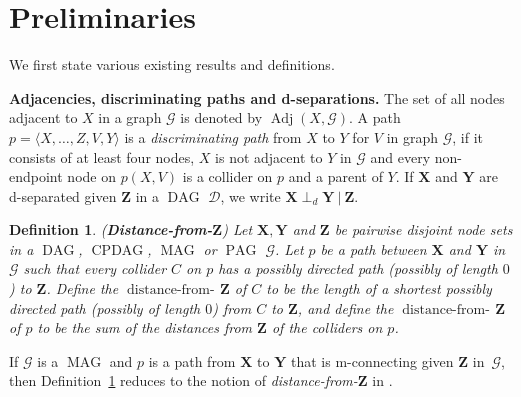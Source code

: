 \documentclass[11pt,a4paper]{article}
\newtheorem{definition}{Definition}
\newcommand\given[1][]{\:#1\vert\:}
\newcommand{\dsepp}{\perp_{d}}
\DeclareMathOperator{\CPDAG}{CPDAG}
\DeclareMathOperator{\DAG}{DAG}
\DeclareMathOperator{\MAG}{MAG}
\DeclareMathOperator{\PAG}{PAG}
\DeclareMathOperator{\Adj}{Adj}
\DeclareMathOperator{\distancefrom}{distance-from-\!}
\newcommand{\g}[1][G]{\mathcal{#1}}
\begin{document}
\appendix

\section{Preliminaries} \label{subsec:additional}

We first state various existing results and definitions.


\textbf{Adjacencies, discriminating paths and d-separations.} The set of all nodes adjacent to $X$ in a graph $\g$ is denoted by $\Adj(X,\g)$. A path $p = \langle X,\dots,Z,V,Y \rangle$ is a \textit{discriminating path} from $X$ to $Y$ for $V$ in graph $\g$, if it consists of at least four nodes, $X$ is not adjacent to $Y$ in $\g$ and every non-endpoint node on $p(X,V)$ is a collider on $p$ and a parent of $Y$.
If $\mathbf{X}$ and  $\mathbf{Y}$ are d-separated given $\mathbf{Z}$ in a $\DAG$ $\g[D]$, we write $\mathbf{X} \dsepp \mathbf{Y} \given \mathbf{Z}$.

\begin{definition} (\textbf{Distance-from-$\mathbf{Z}$})
Let $\mathbf{X,Y}$ and $\mathbf{Z}$ be pairwise disjoint node sets in a $\DAG$, $\CPDAG$, $\MAG$ or $\PAG$ $\g$. Let $p$ be a path between $\mathbf{X}$ and $\mathbf{Y}$ in~$\g$ such that every collider $C$ on $p$ has a possibly directed path (possibly of length $0$) to $\mathbf{Z}$. Define the $\distancefrom{\mathbf{Z}}$ of $C$ to be the length of a shortest possibly directed path (possibly of length $0$) from $C$ to $\mathbf{Z}$, and define the $\distancefrom{\mathbf{Z}}$ of $p$ to be the sum of the distances from $\mathbf{Z}$ of the colliders on $p$.
\label{def:distance from Z}
\end{definition}

\noindent{}If $\g$ is a $\MAG$ and $p$ is a path from $\mathbf{X}$ to $\mathbf{Y}$ that is m-connecting given $\mathbf{Z}$ in~$\g$, then Definition~\ref{def:distance from Z} reduces to the notion of \emph{distance-from-$\mathbf{Z}$} in \citet[][p213]{zhang2006causal}.
\end{document}
